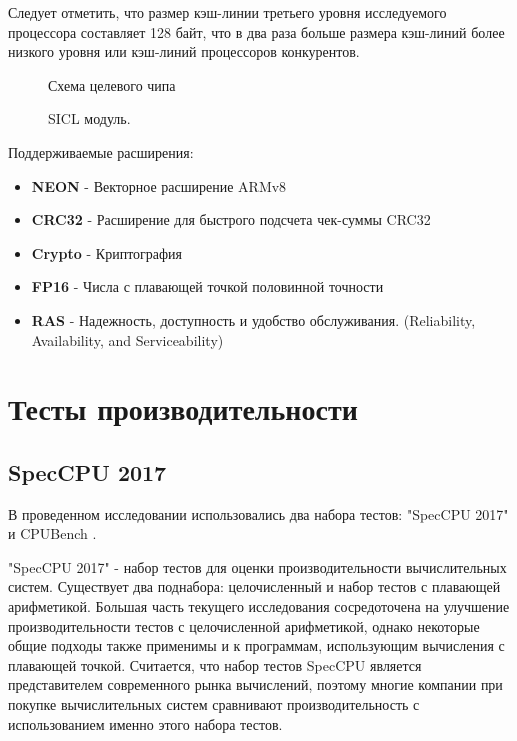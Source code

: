 Следует отметить, что размер кэш-линии третьего уровня исследуемого процессора составляет 128 байт, что в два раза больше размера кэш-линий более низкого уровня или кэш-линий процессоров конкурентов. 

\begin{figure}[htbp]
	\centering
	
	\caption{Схема целевого чипа}
	\label{chip1}
\end{figure}
\begin{figure}[htbp]
	\centering
	
	\caption{SICL модуль.}
	\label{chip2}
\end{figure}

Поддерживаемые расширения:
\begin{itemize}
	\item  \textbf{NEON} - Векторное расширение ARMv8
	\item  \textbf{CRC32} - Расширение для быстрого подсчета чек-суммы CRC32
	\item  \textbf{Crypto} - Криптография
	\item  \textbf{FP16} - Числа с плавающей точкой половинной точности
	\item  \textbf{RAS} -  Надежность, доступность и удобство обслуживания. (Reliability, Availability, and Serviceability)
\end{itemize}

\section{Тесты производительности}\label{p1:tests}
\subsection{SpecCPU 2017}\label{p1:tests:spec}
В проведенном исследовании использовались два набора тестов: "SpecCPU 2017"\phantom{ } \cite{bucek2018spec} и CPUBench \cite{lu2023cpubench}. 

"SpecCPU 2017"\phantom{ } - набор тестов для оценки производительности вычислительных систем. Существует два поднабора: целочисленный и набор тестов с плавающей арифметикой. Большая часть текущего исследования сосредоточена на улучшение производительности тестов с целочисленной арифметикой, однако некоторые общие подходы также применимы и к программам, использующим вычисления с плавающей точкой. Считается, что набор тестов SpecCPU является представителем современного рынка вычислений, поэтому многие компании при покупке вычислительных систем сравнивают производительность с использованием именно этого набора тестов. \cite{bucek2018spec}

